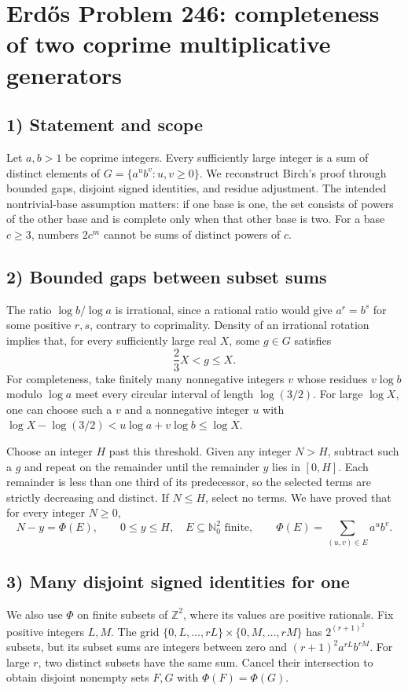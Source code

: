 \section{Erd\H{o}s Problem 246: completeness of two coprime multiplicative generators}

\subsection{1) Statement and scope}
Let $a,b>1$ be coprime integers. Every sufficiently large integer
is a sum of distinct elements of
$G=\{a^u b^v:u,v\geq0\}$. We reconstruct Birch's proof through
bounded gaps, disjoint signed identities, and residue adjustment.
The intended nontrivial-base assumption matters: if one base is
one, the set consists of powers of the other base and is complete
only when that other base is two. For a base $c\geq3$, numbers
$2c^m$ cannot be sums of distinct powers of $c$.

\subsection{2) Bounded gaps between subset sums}
The ratio $\log b/\log a$ is irrational, since a rational ratio
would give $a^r=b^s$ for some positive $r,s$, contrary to
coprimality. Density of an irrational rotation implies that,
for every sufficiently large real $X$, some $g\in G$ satisfies
\[
 \frac23X<g\leq X.
\]
For completeness, take finitely many nonnegative integers $v$
whose residues $v\log b$ modulo $\log a$ meet every circular
interval of length $\log(3/2)$. For large $\log X$, one can
choose such a $v$ and a nonnegative integer $u$ with
$\log X-\log(3/2)<u\log a+v\log b\leq\log X$.

Choose an integer $H$ past this threshold. Given any integer
$N>H$, subtract such a $g$ and repeat on the remainder until
the remainder $y$ lies in $[0,H]$. Each remainder is less than
one third of its predecessor, so the selected terms are strictly
decreasing and distinct. If $N\leq H$, select no terms.
We have proved that for every integer $N\geq0$,
\[
 N-y=\Phi(E),\qquad 0\leq y\leq H,\quad
 E\subseteq\mathbb N_0^2\text{ finite},
 \qquad \Phi(E)=\sum_{(u,v)\in E}a^u b^v.
\]

\subsection{3) Many disjoint signed identities for one}
We also use $\Phi$ on finite subsets of $\mathbb Z^2$, where
its values are positive rationals. Fix positive integers $L,M$.
The grid
$\{0,L,\ldots,rL\}\times\{0,M,\ldots,rM\}$
has $2^{(r+1)^2}$ subsets, but its subset sums are integers
between zero and $(r+1)^2a^{rL}b^{rM}$.
For large $r$, two distinct subsets have the same sum.
Cancel their intersection to obtain disjoint nonempty sets
$F,G$ with $\Phi(F)=\Phi(G)$.


